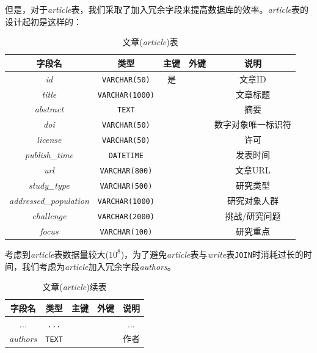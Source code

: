 \documentclass[UTF8,openany]{ctexbook}
\begin{document}
但是，对于\textit{article}表，我们采取了加入冗余字段来提高数据库的效率。\textit{article}表的设计起初是这样的：

\begin{table}[H]
    \centering
    \begin{tabular}{|c|c|c|c|c|}
        \hline
        \textbf{字段名} & \textbf{类型} & \textbf{主键} & \textbf{外键} & \textbf{说明} \\
        \hline
        \textit{id} & \texttt{VARCHAR(50)} & 是 &  & 文章ID \\
        \hline
        \textit{title} & \texttt{VARCHAR(1000)} &  &  & 文章标题 \\
        \hline
        \textit{abstract} & \texttt{TEXT} &  &  & 摘要 \\
        \hline
        \textit{doi} & \texttt{VARCHAR(50)} &  &  & 数字对象唯一标识符 \\
        \hline
        \textit{license} & \texttt{VARCHAR(50)} &  &  & 许可 \\
        \hline
        \textit{publish\_time} & \texttt{DATETIME} &  &  & 发表时间 \\
        \hline
        \textit{url} & \texttt{VARCHAR(800)} &  &  & 文章URL \\
        \hline
        \textit{study\_type} & \texttt{VARCHAR(500)} &  &  & 研究类型 \\
        \hline
        \textit{addressed\_population} & \texttt{VARCHAR(1000)} &  &  & 研究对象人群 \\
        \hline
        \textit{challenge} & \texttt{VARCHAR(2000)} &  &  & 挑战/研究问题 \\
        \hline
        \textit{focus} & \texttt{VARCHAR(100)} &  &  & 研究重点 \\
        \hline
    \end{tabular}
    \caption{文章(\textit{article})表}
\end{table}

考虑到\textit{article}表数据量较大($10^8$)，为了避免\textit{article}表与\textit{write}表\texttt{JOIN}时消耗过长的时间，我们考虑为\textit{article}加入冗余字段\textit{authors}。

\begin{table}[H]
    \centering
    \begin{tabular}{|c|c|c|c|c|}
        \hline
        \textbf{字段名} & \textbf{类型} & \textbf{主键} & \textbf{外键} & \textbf{说明} \\
        \hline
        \textit{...} & \texttt{...} &  &  & ... \\
        \hline
        \textit{authors} & \texttt{TEXT} &  &  & 作者 \\
        \hline
    \end{tabular}
    \caption{文章(\textit{article})续表}
\end{table}
\end{document}
